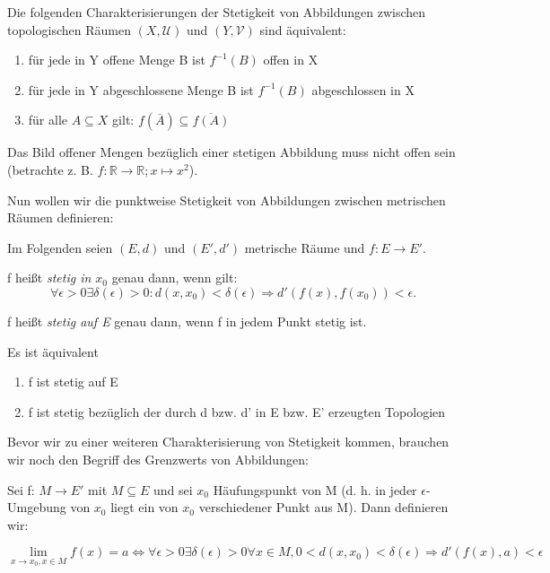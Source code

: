 \documentclass[10pt]{scrbook}
\begin{document}
\begin{Sa}
Die folgenden Charakterisierungen der Stetigkeit von Abbildungen zwischen topologischen Räumen $(X, \mathcal{U})$ und $(Y, \mathcal{V})$ sind äquivalent:
\begin{enumerate}
	\item für jede in Y offene Menge B ist $f^{-1}(B)$ offen in X
	\item für jede in Y abgeschlossene Menge B ist $f^{-1}(B)$ abgeschlossen in X
	\item für alle $A\subseteq X$ gilt: $f(\overline{A})\subseteq\overline{f(A)}$
\end{enumerate}
\end{Sa}

\begin{Bem}
Das Bild offener Mengen bezüglich einer stetigen Abbildung muss nicht offen sein (betrachte z. B. $f: \mathbb{R}\rightarrow \mathbb{R}; x\mapsto x^2$).
\end{Bem}

Nun wollen wir die punktweise Stetigkeit von Abbildungen zwischen metrischen Räumen definieren:

Im Folgenden seien $(E, d)$ und $(E', d')$ metrische Räume und $f: E\rightarrow E'$.

\begin{Def}
f heißt \emph{stetig in $x_0$} genau dann, wenn gilt:
\begin{displaymath}
\forall \epsilon>0\exists \delta(\epsilon)>0: d(x, x_0)<\delta(\epsilon)\Rightarrow d'(f(x), f(x_0))<\epsilon.
\end{displaymath}
\end{Def}

\begin{Def}
f heißt \emph{stetig auf E} genau dann, wenn f in jedem Punkt stetig ist.
\end{Def}

\begin{Sa}
Es ist äquivalent
\begin{enumerate}
	\item f ist stetig auf E
	\item f ist stetig bezüglich der durch d bzw. d' in E bzw. E' erzeugten Topologien
\end{enumerate}
\end{Sa}

Bevor wir zu einer weiteren Charakterisierung von Stetigkeit kommen, brauchen wir noch den Begriff des Grenzwerts  von Abbildungen:

\begin{Def}
Sei f: $M\rightarrow E'$ mit $M\subseteq E$ und sei $x_0$ Häufungspunkt von M (d. h. in jeder $\epsilon$-Umgebung von $x_0$ liegt ein von $x_0$ verschiedener Punkt aus M). Dann definieren wir:

\begin{displaymath}
	\lim_{x\rightarrow x_0, x\in M} f(x)=a\Leftrightarrow \forall \epsilon>0\exists \delta(\epsilon)>0 \forall x\in M, 0<d(x, x_0)<\delta(\epsilon)\Rightarrow d'(f(x), a)< \epsilon
\end{displaymath}
\end{Def}
\end{document}
